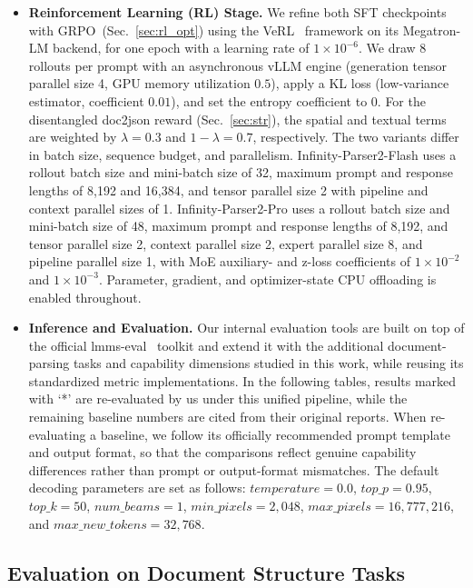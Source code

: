 \begin{itemize}[
  leftmargin=1.0em,
  labelsep=0.5em
]
\item \textbf{Reinforcement Learning (RL) Stage.} We refine both SFT checkpoints with GRPO~(Sec.~\ref{sec:rl_opt}) using the VeRL~\cite{sheng2025hybridflow} framework on its Megatron-LM backend, for one epoch with a learning rate of $1 \times 10^{-6}$. We draw $8$ rollouts per prompt with an asynchronous vLLM engine (generation tensor parallel size 4, GPU memory utilization $0.5$), apply a KL loss (low-variance estimator, coefficient $0.01$), and set the entropy coefficient to $0$. For the disentangled doc2json reward (Sec.~\ref{sec:str}), the spatial and textual terms are weighted by $\lambda = 0.3$ and $1-\lambda = 0.7$, respectively. The two variants differ in batch size, sequence budget, and parallelism. Infinity-Parser2-Flash uses a rollout batch size and mini-batch size of 32, maximum prompt and response lengths of 8,192 and 16,384, and tensor parallel size 2 with pipeline and context parallel sizes of 1. Infinity-Parser2-Pro uses a rollout batch size and mini-batch size of 48, maximum prompt and response lengths of 8,192, and tensor parallel size 2, context parallel size 2, expert parallel size 8, and pipeline parallel size 1, with MoE auxiliary- and z-loss coefficients of $1 \times 10^{-2}$ and $1 \times 10^{-3}$. Parameter, gradient, and optimizer-state CPU offloading is enabled throughout.

\item \textbf{Inference and Evaluation.} Our internal evaluation tools are built on top of the official lmms-eval~\cite{zhang2025lmms} toolkit and extend it with the additional document-parsing tasks and capability dimensions studied in this work, while reusing its standardized metric implementations. In the following tables, results marked with `*' are re-evaluated by us under this unified pipeline, while the remaining baseline numbers are cited from their original reports. When re-evaluating a baseline, we follow its officially recommended prompt template and output format, so that the comparisons reflect genuine capability differences rather than prompt or output-format mismatches. The default decoding parameters are set as follows: $temperature = 0.0$, $top\_p = 0.95$, $top\_k = 50$, $num\_beams = 1$, $min\_pixels = 2,048$, $max\_pixels = 16,777,216$, and $max\_new\_tokens = 32,768$.
\end{itemize}

\subsection{Evaluation on Document Structure Tasks}

